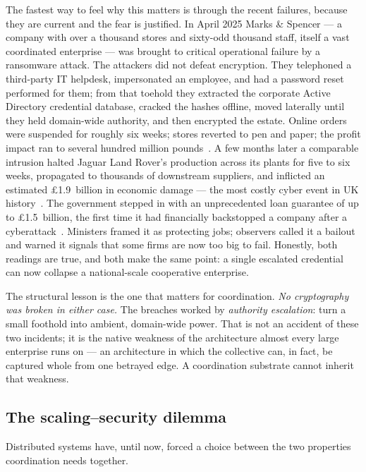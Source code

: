 \documentclass[11pt]{article}
\begin{document}
The fastest way to feel why this matters is through the recent failures, because they are current and the fear is justified. In April 2025 Marks \& Spencer --- a company with over a thousand stores and sixty-odd thousand staff, itself a vast coordinated enterprise --- was brought to critical operational failure by a ransomware attack. The attackers did not defeat encryption. They telephoned a third-party IT helpdesk, impersonated an employee, and had a password reset performed for them; from that toehold they extracted the corporate Active Directory credential database, cracked the hashes offline, moved laterally until they held domain-wide authority, and then encrypted the estate. Online orders were suspended for roughly six weeks; stores reverted to pen and paper; the profit impact ran to several hundred million pounds~\cite{msProfit,msKill}. A few months later a comparable intrusion halted Jaguar Land Rover's production across its plants for five to six weeks, propagated to thousands of downstream suppliers, and inflicted an estimated \pounds1.9~billion in economic damage --- the most costly cyber event in UK history~\cite{jlrCost}. The government stepped in with an unprecedented loan guarantee of up to \pounds1.5~billion, the first time it had financially backstopped a company after a cyberattack~\cite{jlrLoan}. Ministers framed it as protecting jobs; observers called it a bailout and warned it signals that some firms are now too big to fail. Honestly, both readings are true, and both make the same point: a single escalated credential can now collapse a national-scale cooperative enterprise.

The structural lesson is the one that matters for coordination. \emph{No cryptography was broken in either case.} The breaches worked by \emph{authority escalation}: turn a small foothold into ambient, domain-wide power. That is not an accident of these two incidents; it is the native weakness of the architecture almost every large enterprise runs on --- an architecture in which the collective can, in fact, be captured whole from one betrayed edge. A coordination substrate cannot inherit that weakness.

\subsection*{The scaling--security dilemma}

Distributed systems have, until now, forced a choice between the two properties coordination needs together.
\end{document}
